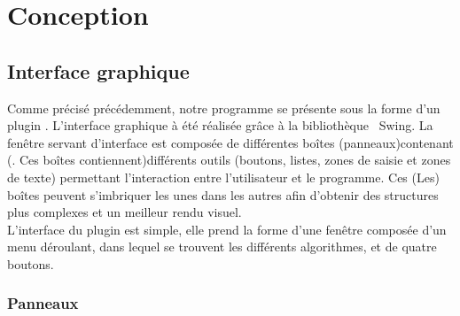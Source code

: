 
\newcommand{\black}{\color{black}}
\newcommand{\blue}{\color{blue}}

\chapter{Conception}

\section{Interface graphique}

Comme précisé précédemment, notre programme se présente sous la forme d'un plugin \imj . L'interface graphique à été réalisée grâce à la bibliothèque  \java ~Swing. %
La fenêtre servant d'interface est composée de différentes boîtes (panneaux)\blue contenant (. Ces boîtes contiennent)\black différents outils (boutons, listes, zones de saisie et zones de texte) permettant l'interaction entre l'utilisateur et le programme. \blue Ces (Les) \black boîtes peuvent s'imbriquer les unes dans les autres afin d'obtenir des structures plus complexes et un meilleur rendu visuel. \\
L'interface du plugin est simple, elle prend la forme d'une fenêtre composée d'un menu déroulant, dans lequel se trouvent les différents algorithmes, et de quatre boutons. 

\subsection{Panneaux}

